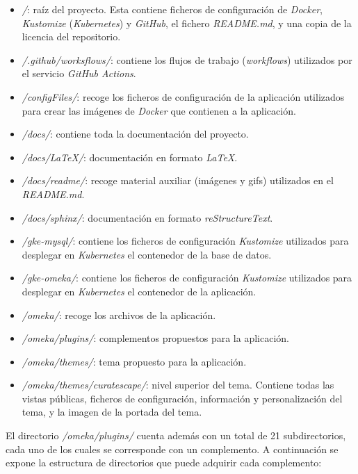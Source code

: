 \documentclass[
]{article}
\providecommand{\tightlist}{%
  \setlength{\itemsep}{0pt}\setlength{\parskip}{0pt}}
\begin{document}
\begin{itemize}
\tightlist
\item
  \emph{/}: raíz del proyecto. Esta contiene ficheros de configuración
  de \emph{Docker}, \emph{Kustomize} (\emph{Kubernetes}) y
  \emph{GitHub}, el fichero \emph{README.md}, y una copia de la licencia
  del repositorio.
\item
  \emph{/.github/worksflows/}: contiene los flujos de trabajo
  (\emph{workflows}) utilizados por el servicio \emph{GitHub Actions}.
\item
  \emph{/configFiles/}: recoge los ficheros de configuración de la
  aplicación utilizados para crear las imágenes de \emph{Docker} que
  contienen a la aplicación.
\item
  \emph{/docs/}: contiene toda la documentación del proyecto.
\item
  \emph{/docs/LaTeX/}: documentación en formato \emph{LaTeX}.
\item
  \emph{/docs/readme/}: recoge material auxiliar (imágenes y gifs)
  utilizados en el \emph{README.md}.
\item
  \emph{/docs/sphinx/}: documentación en formato \emph{reStructureText}.
\item
  \emph{/gke-mysql/}: contiene los ficheros de configuración
  \emph{Kustomize} utilizados para desplegar en \emph{Kubernetes} el
  contenedor de la base de datos.
\item
  \emph{/gke-omeka/}: contiene los ficheros de configuración
  \emph{Kustomize} utilizados para desplegar en \emph{Kubernetes} el
  contenedor de la aplicación.
\item
  \emph{/omeka/}: recoge los archivos de la aplicación.
\item
  \emph{/omeka/plugins/}: complementos propuestos para la aplicación.
\item
  \emph{/omeka/themes/}: tema propuesto para la aplicación.
\item
  \emph{/omeka/themes/curatescape/}: nivel superior del tema. Contiene
  todas las vistas públicas, ficheros de configuración, información y
  personalización del tema, y la imagen de la portada del tema.
\end{itemize}

El directorio \emph{/omeka/plugins/} cuenta además con un total de 21
subdirectorios, cada uno de los cuales se corresponde con un
complemento. A continuación se expone la estructura de directorios que
puede adquirir cada complemento:
\end{document}
